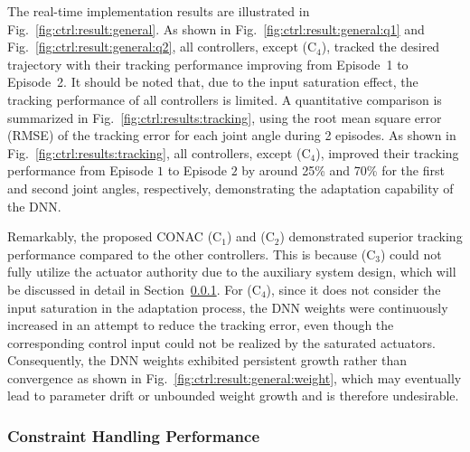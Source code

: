 \documentclass[letterpaper, journal]{IEEEtran}
\begin{document}
The real-time implementation results are illustrated in Fig.~\ref{fig:ctrl:result:general}.
As shown in Fig.~\ref{fig:ctrl:result:general:q1} and Fig.~\ref{fig:ctrl:result:general:q2}, all controllers, except (C$_4$), tracked the desired trajectory with their tracking performance improving from
Episode~1 to Episode~2.
It should be noted that, due to the input saturation effect, the tracking performance of all controllers is limited.
A quantitative comparison is summarized in Fig.~\ref{fig:ctrl:results:tracking}, using the root mean square error (RMSE) of the tracking error for each joint angle during 2 episodes.
As shown in Fig.~\ref{fig:ctrl:results:tracking}, all controllers, except (C$_4$), improved their tracking performance from Episode $1$ to Episode $2$ by around 25\% and 70\% for the first and second joint angles, respectively, demonstrating the adaptation capability of the DNN.

Remarkably, the proposed CONAC (C$_1$) and (C$_2$) demonstrated superior tracking performance compared to the other controllers.
This is because (C$_3$) could not fully utilize the actuator authority due to the auxiliary system design, which will be discussed in detail in Section~\ref{sec:val:results:constraint}.
For (C$_4$), since it does not consider the input saturation in the adaptation process, the DNN weights were continuously increased in an attempt to reduce the tracking error, even though the corresponding control input could not be realized by the saturated actuators.
Consequently, the DNN weights exhibited persistent growth rather than convergence as shown in Fig.~\ref{fig:ctrl:result:general:weight}, which may eventually lead to parameter drift or unbounded weight growth and is therefore undesirable.


\subsubsection{Constraint Handling Performance} \label{sec:val:results:constraint}
\end{document}
